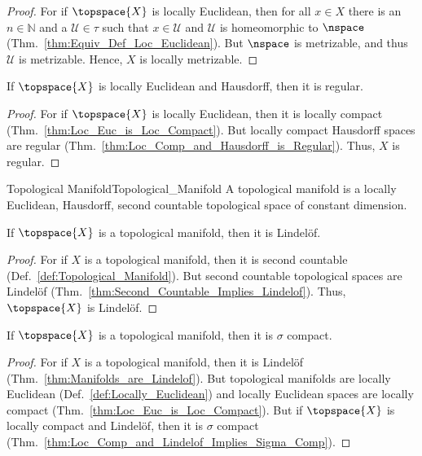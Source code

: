 \documentclass{article}                                                        %
\begin{document}
        \begin{proof}
            For if $\topspace{X}$ is locally Euclidean, then for all $x\in{X}$
            there is an $n\in\mathbb{N}$ and a $\mathcal{U}\in\tau$ such that
            $x\in\mathcal{U}$ and $\mathcal{U}$ is homeomorphic to
            $\nspace$ (Thm.~\ref{thm:Equiv_Def_Loc_Euclidean}). But
            $\nspace$ is metrizable, and thus $\mathcal{U}$ is metrizable.
            Hence, $X$ is locally metrizable.
        \end{proof}
        \begin{theorem}
            \label{thm:Loc_Euc_Haus_is_Regular}%
            If $\topspace{X}$ is locally Euclidean and Hausdorff, then it is
            regular.
        \end{theorem}
        \begin{proof}
            For if $\topspace{X}$ is locally Euclidean, then it is locally
            compact (Thm.~\ref{thm:Loc_Euc_is_Loc_Compact}). But locally
            compact Hausdorff spaces are regular
            (Thm.~\ref{thm:Loc_Comp_and_Hausdorff_is_Regular}). Thus,
            $X$ is regular.
        \end{proof}
        \begin{fdefinition}{Topological Manifold}{Topological_Manifold}
            A topological manifold is a locally Euclidean, Hausdorff, second
            countable topological space of constant dimension.
        \end{fdefinition}
        \begin{theorem}
            \label{thm:Manifolds_are_Lindelof}%
            If $\topspace{X}$ is a topological manifold, then it is
            Lindel\"{o}f.
        \end{theorem}
        \begin{proof}
            For if $X$ is a topological manifold, then it is second countable
            (Def.~\ref{def:Topological_Manifold}). But second countable
            topological spaces are Lindel\"{o}f
            (Thm.~\ref{thm:Second_Countable_Implies_Lindelof}). Thus,
            $\topspace{X}$ is Lindel\"{o}f.
        \end{proof}
        \begin{theorem}
            If $\topspace{X}$ is a topological manifold, then it is $\sigma$
            compact.
        \end{theorem}
        \begin{proof}
            For if $X$ is a topological manifold, then it is Lindel\"{o}f
            (Thm.~\ref{thm:Manifolds_are_Lindelof}). But topological manifolds
            are locally Euclidean (Def.~\ref{def:Locally_Euclidean}) and locally
            Euclidean spaces are locally compact
            (Thm.~\ref{thm:Loc_Euc_is_Loc_Compact}). But if $\topspace{X}$ is
            locally compact and Lindel\"{o}f, then it is $\sigma$ compact
            (Thm.~\ref{thm:Loc_Comp_and_Lindelof_Implies_Sigma_Comp}).
        \end{proof}
\end{document}
